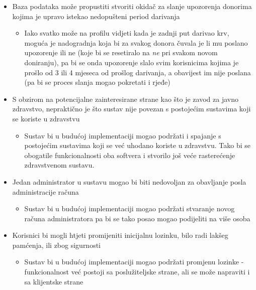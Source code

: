 {\begin{itemize}
                \item Baza podataka može propustiti stvoriti okidač za slanje upozorenja donorima kojima je upravo istekao nedopušteni period darivanja
                \begin{itemize}
                    \item Iako svatko može na profilu vidjeti kada je zadnji put darivao krv, moguća je nadogradnja koja bi za svakog donora čuvala je li mu poslano upozorenje ili ne (koje bi se resetiralo na \textit{ne} pri svakom novom doniranju), pa bi se onda upozorenje slalo svim korisnicima kojima je prošlo  od 3 ili 4 mjeseca od prošlog darivanja, a obavijest im nije poslana (pa bi se proces slanja mogao pokretati i rjeđe)
                \end{itemize}
                
                \item S obzirom na potencijalne zainteresirane strane kao što je zavod za javno zdravstvo, nepraktično je što sustav nije povezan s postojećim sustavima koji se koriste u zdravstvu
                \begin{itemize}
                    \item Sustav bi u budućoj implementaciji mogao podržati i spajanje s postojećim sustavima koji se već uhodano koriste u zdravstvu. Tako bi se obogatile funkcionalnosti oba softvera i stvorilo još veće rasterećenje zdravstvenom sustavu.
                \end{itemize}
                
                \item Jedan administrator u sustavu mogao bi biti nedovoljan za obavljanje posla administracije računa
                \begin{itemize}
                    \item Sustav bi u budućoj implementaciji mogao podržati stvaranje novog računa administratora pa bi se tako posao mogao podijeliti na više osoba
                \end{itemize}
                
                \item Korisnici bi mogli htjeti promijeniti inicijalnu lozinku, bilo radi lakšeg pamćenja, ili zbog sigurnosti
                \begin{itemize}
                    \item Sustav bi u budućoj implementaciji mogao podržati promjenu lozinke - funkcionalnost već postoji sa poslužiteljske strane, ali se može napraviti i sa klijentske strane
                \end{itemize}
                
            \end{itemize}
            }
            
